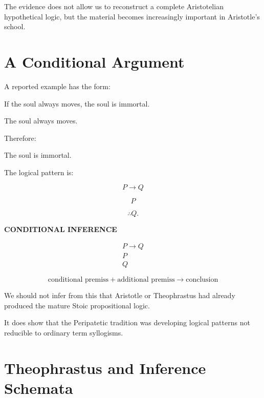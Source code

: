 \documentclass[11pt]{article}
\begin{document}
The evidence does not allow us to reconstruct a complete
Aristotelian hypothetical logic, but the material becomes
increasingly important in Aristotle's school.

\section{A Conditional Argument}

A reported example has the form:

\begin{center}
If the soul always moves, the soul is immortal.
\end{center}

\begin{center}
The soul always moves.
\end{center}

Therefore:

\begin{center}
The soul is immortal.
\end{center}

The logical pattern is:

\[
P\rightarrow Q
\]

\[
P
\]

\[
\therefore Q.
\]

\begin{whiteboard}
\textbf{CONDITIONAL INFERENCE}

\[
\begin{array}{c}
P\rightarrow Q\\
P\\
\hline
Q
\end{array}
\]

\[
\text{conditional premiss}
+
\text{additional premiss}
\rightarrow
\text{conclusion}
\]
\end{whiteboard}

We should not infer from this that Aristotle or Theophrastus had
already produced the mature Stoic propositional logic.

It does show that the Peripatetic tradition was developing logical
patterns not reducible to ordinary term syllogisms.

\section{Theophrastus and Inference Schemata}
\end{document}
